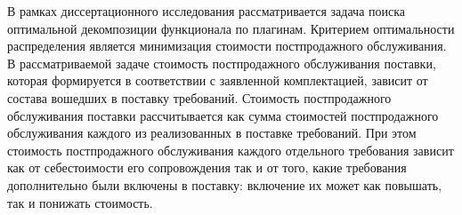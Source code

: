 В рамках диссертационного исследования рассматривается задача поиска оптимальной декомпозиции функционала по плагинам. Критерием оптимальности распределения является минимизация стоимости постпродажного обслуживания. В рассматриваемой задаче стоимость постпродажного обслуживания поставки, которая формируется в соответствии с заявленной комплектацией, зависит от состава вошедших в поставку требований. Стоимость постпродажного обслуживания поставки рассчитывается как сумма стоимостей постпродажного обслуживания каждого из реализованных в поставке требований. При этом стоимость постпродажного обслуживания каждого отдельного требования зависит как от себестоимости его сопровождения так и от того, какие требования дополнительно были включены в поставку: включение их может как повышать, так и понижать стоимость.
